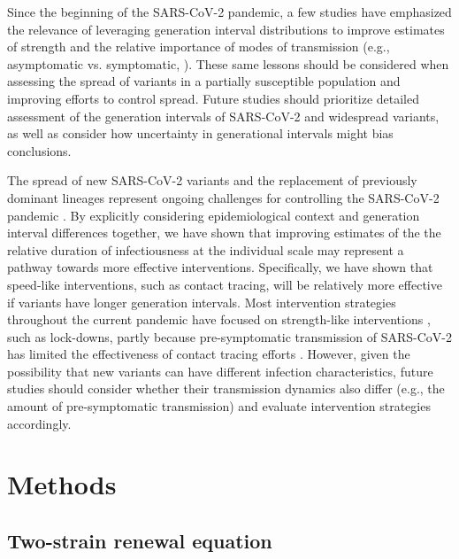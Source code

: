 \documentclass[12pt]{article}
\begin{document}
Since the beginning of the SARS-CoV-2 pandemic, a few studies have emphasized the relevance of leveraging generation interval distributions to improve estimates of strength \citep{doi:10.1098/rsif.2020.0144,ali2020serial,gostic2020practical,park2021forward} and the relative importance of modes of transmission (e.g., asymptomatic vs. symptomatic, \cite{park2020time}).
These same lessons should be considered when assessing the spread of variants in a partially susceptible population and improving efforts to control spread.
Future studies should prioritize detailed assessment of the generation intervals of SARS-CoV-2 and widespread variants, as well as consider how uncertainty in generational intervals might bias conclusions.

The spread of new SARS-CoV-2 variants and the replacement of previously dominant lineages represent ongoing challenges for controlling the SARS-CoV-2 pandemic \citep{abdool2021new,fontanet2021sars,walensky2021sars}.  
By explicitly considering epidemiological context and generation interval differences together, we have shown that improving estimates of the the relative duration of infectiousness at the individual scale may represent a pathway towards more effective interventions. 
Specifically, we have shown that speed-like interventions, such as contact tracing, will be relatively more effective if variants have longer generation intervals.
Most intervention strategies throughout the current pandemic have focused on strength-like interventions \citep{flaxman2020Rt}, such as lock-downs, partly because pre-symptomatic transmission of SARS-CoV-2 has limited the effectiveness of contact tracing efforts \citep{hellewell2020feasibility}.
However, given the possibility that new variants can have different infection characteristics, future studies should consider whether their transmission dynamics also differ (e.g., the amount of pre-symptomatic transmission) and evaluate intervention strategies accordingly.

\section{Methods}

\subsection{Two-strain renewal equation}
\end{document}
